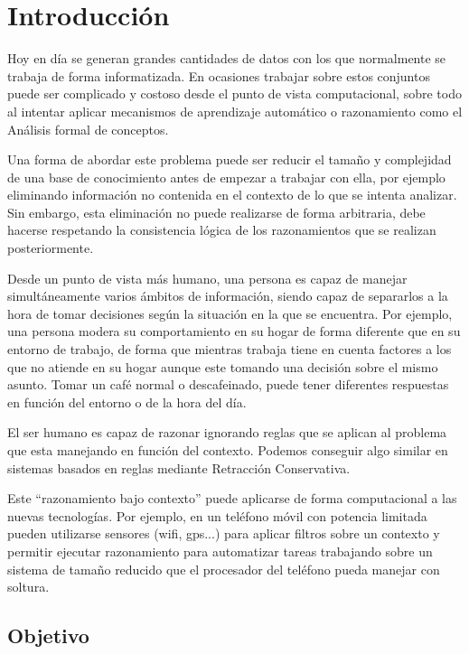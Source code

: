 
\chapter*{Introducción}


	Hoy en día se generan grandes cantidades de datos con los que normalmente se trabaja de forma informatizada. En ocasiones trabajar sobre estos conjuntos puede ser complicado y costoso desde el punto de vista computacional, sobre todo al intentar aplicar mecanismos de aprendizaje automático o razonamiento como el Análisis formal de conceptos.
	
	Una forma de abordar este problema puede ser reducir el tamaño y complejidad de una base de conocimiento antes de empezar a trabajar con ella, por ejemplo eliminando información no contenida en el contexto de  lo que se intenta analizar. Sin embargo, esta eliminación no puede realizarse de forma arbitraria, debe hacerse respetando la consistencia lógica de los razonamientos que se realizan posteriormente.    
	
	Desde un punto de vista más humano, una persona es capaz de manejar simultáneamente varios
	ámbitos de información, siendo capaz de separarlos a la hora de tomar decisiones según la 
	situación en la que se encuentra. Por ejemplo, una persona modera su comportamiento en su hogar
	de forma diferente que en su entorno de trabajo, de forma que mientras trabaja tiene en cuenta factores
	a los que no atiende en su hogar aunque este tomando una decisión sobre el mismo asunto. Tomar un café 
	normal o descafeinado, puede tener diferentes respuestas en función del entorno o de la hora del día.
	
	El ser humano es capaz de razonar ignorando reglas que se aplican al problema que esta manejando en función del contexto. Podemos conseguir
	algo similar en sistemas basados en reglas mediante Retracción Conservativa.
	
	Este ``razonamiento bajo contexto'' puede aplicarse de forma computacional a las nuevas tecnologías. Por ejemplo, en un teléfono móvil con potencia limitada pueden utilizarse sensores (wifi, gps...) para aplicar filtros sobre un contexto y permitir ejecutar razonamiento para automatizar tareas trabajando sobre un sistema de tamaño reducido que el procesador del teléfono pueda manejar con soltura.
	
 
\section*{Objetivo}

